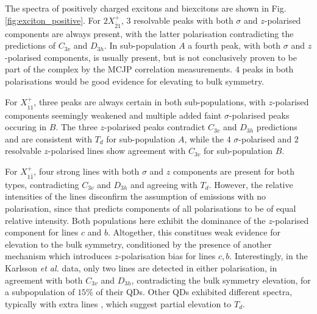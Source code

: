 The spectra of positively charged excitons and biexcitons are shown in Fig. \ref{fig:exciton_positive}. For $2X^+_{\bar{2}1}$, 3 resolvable peaks with both $\sigma$ and $z$-polarised components are always present, with the latter polarisation contradicting the predictions of $C_{3v}$ and $D_{3h}$. In sub-population $A$ a fourth peak, with both $\sigma$ and $z$-polarised components, is usually present, but is not conclusively proven to be part of the complex by the MCJP correlation measurements. $4$ peaks in both polarisations would be good evidence for elevating to bulk symmetry.

For $X^+_{\bar{1}1}$, three peaks are always certain in both sub-populations, with $z$-polarised components seemingly weakened and multiple added faint $\sigma$-polarised peaks occuring in $B$. The three $z$-polarised peaks contradict $C_{3v}$ and $D_{3h}$ predictions and are consistent with $T_d$ for sub-population $A$, while the $4$ $\sigma$-polarised and $2$ resolvable $z$-polarised lines show agreement with $C_{3v}$ for sub-population $B$.

For $X^+_{1\bar{1}}$, four strong lines with both $\sigma$ and $z$ components are present for both types, contradicting $C_{3v}$ and $D_{3h}$ and agreeing with $T_d$. However, the relative intensities of the lines disconfirm the assumption of emissions with no polarisation, since that predicts components of all polarisations to be of equal relative intensity. Both populations here exhibit the dominance of the $z$-polarised component for lines $c$ and $b$. Altogether, this constitues weak evidence for elevation to the bulk symmetry, conditioned by the presence of another mechanism which introduces $z$-polarisation bias for lines $c,b$. Interestingly, in the Karlsson \textit{et al.} data, only two lines are detected in either polarisation, in agreement with both $C_{3v}$ and $D_{3h}$, contradicting the bulk symmetry elevation, for a subpopulation of $15\%$ of their QDs. Other QDs exhibited different spectra, typically with extra lines \cite[Fig. 19]{karlsson}, which suggest partial elevation to $T_d$.
\\

